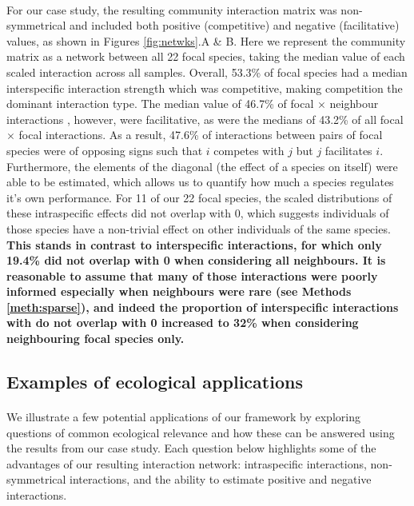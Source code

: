 \documentclass[a4,12pt]{article}
\begin{document}
\begin{refsection}
    \paragraph{}
    For our case study, the resulting community interaction matrix was non-symmetrical and included both positive (competitive) and negative (facilitative) values, as shown in Figures \ref{fig:netwks}.A \& B. Here we represent the community matrix as a network between all 22 focal species, taking the median value of each scaled interaction  across all samples. Overall, 53.3\% of focal species had a median interspecific interaction strength which was competitive, making competition the dominant interaction type. The median value of 46.7\% of focal $\times$ neighbour interactions , however, were facilitative, as were the medians of 43.2\% of all focal $\times$ focal interactions. As a result, 47.6\% of interactions between pairs of focal species were of opposing signs such that $i$ competes with $j$ but $j$ facilitates $i$. Furthermore, the elements of the diagonal (the effect of a species on itself) were able to be estimated, which allows us to quantify how much a species regulates it's own performance. For 11 of our 22 focal species, the scaled distributions of these intraspecific effects did not overlap with 0, which suggests individuals of those species have a non-trivial effect on other individuals of the same species. \textbf{This stands in contrast to interspecific interactions, for which only 19.4\% did not overlap with 0 when considering all neighbours. It is reasonable to assume that many of those interactions were poorly informed especially when neighbours were rare (see Methods \ref{meth:sparse}), and indeed the proportion of interspecific interactions with do not overlap with 0 increased to 32\% when considering neighbouring focal species only.}

    \subsection{Examples of ecological applications}

    \paragraph{}
    We illustrate a few potential applications of our framework by exploring questions of common ecological relevance and how these can be answered using the results from our case study. Each question below highlights some of the advantages of our resulting interaction network: intraspecific interactions, non-symmetrical interactions, and the ability to estimate positive and negative interactions. %



\end{refsection}
\end{document}
